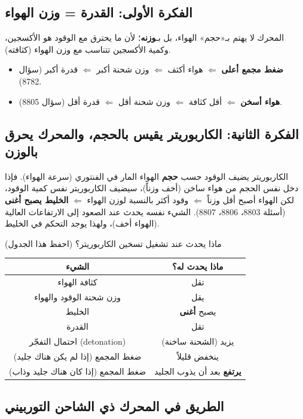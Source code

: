 \documentclass[11pt,a4paper]{article}
\newcommand{\en}[1]{\textenglish{#1}}
\begin{document}
\subsection{الفكرة الأولى: القدرة = وزن الهواء}
المحرك لا يهتم بـ«حجم» الهواء، بل بـ\textbf{وزنه}؛ لأن ما يحترق مع الوقود هو الأكسجين، وكمية الأكسجين تتناسب مع وزن الهواء (كثافته).
\begin{itemize}
  \item \textbf{ضغط مجمع أعلى} $\Leftarrow$ هواء أكثف $\Leftarrow$ وزن شحنة أكبر $\Leftarrow$ قدرة أكبر (سؤال 8782).
  \item \textbf{هواء أسخن} $\Leftarrow$ أقل كثافة $\Leftarrow$ وزن شحنة أقل $\Leftarrow$ قدرة أقل (سؤال 8805).
\end{itemize}

\subsection{الفكرة الثانية: الكاربوريتر يقيس بالحجم، والمحرك يحرق بالوزن}
الكاربوريتر يضيف الوقود حسب \textbf{حجم} الهواء المار في الفنتوري (سرعة الهواء). فإذا دخل نفس الحجم من هواء ساخن (أخف وزناً)، سيضيف الكاربوريتر نفس كمية الوقود، لكن الهواء أصبح أقل وزناً $\Leftarrow$ وقود أكثر بالنسبة لوزن الهواء $\Leftarrow$ \textbf{الخليط يصبح أغنى} (أسئلة 8803، 8806، 8807). الشيء نفسه يحدث عند الصعود إلى الارتفاعات العالية (الهواء أخف)، ولهذا يوجد التحكم في الخليط.

\begin{concept}{ماذا يحدث عند تشغيل تسخين الكاربوريتر؟ (احفظ هذا الجدول)}
\begin{center}
\begin{tabular}{|c|c|}
\hline
\textbf{الشيء} & \textbf{ماذا يحدث له؟}\\\hline
كثافة الهواء & تقل\\\hline
وزن شحنة الوقود والهواء & يقل\\\hline
الخليط & يصبح \textbf{أغنى}\\\hline
القدرة & تقل\\\hline
احتمال التفجّر (\en{detonation}) & يزيد (الشحنة ساخنة)\\\hline
ضغط المجمع (إذا لم يكن هناك جليد) & ينخفض قليلاً\\\hline
ضغط المجمع (إذا كان هناك جليد وذاب) & \textbf{يرتفع} بعد أن يذوب الجليد\\\hline
\end{tabular}
\end{center}
\end{concept}

\subsection{الطريق في المحرك ذي الشاحن التوربيني}
\end{document}
